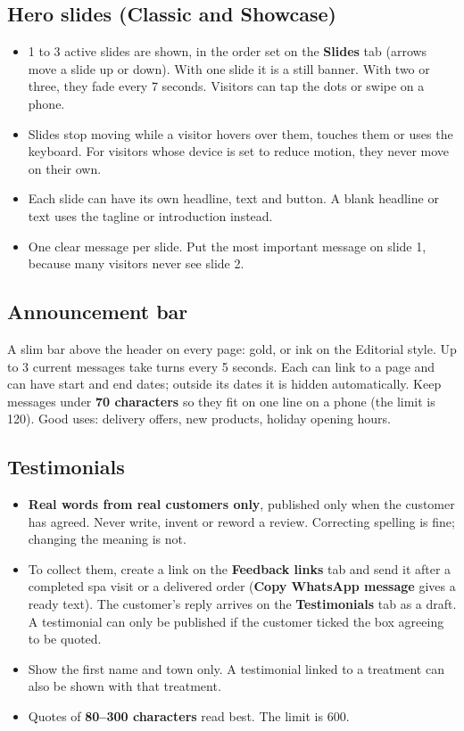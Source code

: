 \documentclass[11pt,a4paper]{article}
\newcommand{\tab}[1]{\textsf{\textbf{#1}}}
\begin{document}
\subsection*{Hero slides (Classic and Showcase)}
\begin{itemize}
  \item 1 to 3 active slides are shown, in the order set on the \tab{Slides} tab (arrows move a slide up or down). With one slide it is a still banner. With two or three, they fade every 7 seconds. Visitors can tap the dots or swipe on a phone.
  \item Slides stop moving while a visitor hovers over them, touches them or uses the keyboard. For visitors whose device is set to reduce motion, they never move on their own.
  \item Each slide can have its own headline, text and button. A blank headline or text uses the tagline or introduction instead.
  \item One clear message per slide. Put the most important message on slide 1, because many visitors never see slide 2.
\end{itemize}

\subsection*{Announcement bar}
A slim bar above the header on every page: gold, or ink on the Editorial style. Up to 3 current messages take turns every 5 seconds. Each can link to a page and can have start and end dates; outside its dates it is hidden automatically. Keep messages under \textbf{70 characters} so they fit on one line on a phone (the limit is 120). Good uses: delivery offers, new products, holiday opening hours.

\subsection*{Testimonials}
\begin{itemize}
  \item \textbf{Real words from real customers only}, published only when the customer has agreed. Never write, invent or reword a review. Correcting spelling is fine; changing the meaning is not.
  \item To collect them, create a link on the \tab{Feedback links} tab and send it after a completed spa visit or a delivered order (\tab{Copy WhatsApp message} gives a ready text). The customer's reply arrives on the \tab{Testimonials} tab as a draft. A testimonial can only be published if the customer ticked the box agreeing to be quoted.
  \item Show the first name and town only. A testimonial linked to a treatment can also be shown with that treatment.
  \item Quotes of \textbf{80--300 characters} read best. The limit is 600.
\end{itemize}
\end{document}
